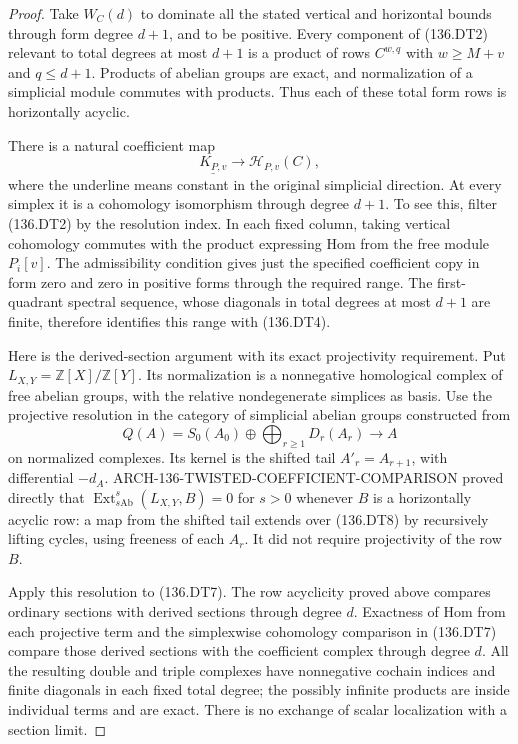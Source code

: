 \begin{proof}
Take \(W_C(d)\) to dominate all the stated vertical and horizontal
bounds through form degree \(d+1\), and to be positive.
Every component of (136.DT2) relevant to total degrees at most
\(d+1\) is a product of rows \(C^{w,q}\) with
\(w\geq M+v\) and \(q\leq d+1\).
Products of abelian groups are exact, and normalization of a
simplicial module commutes with products. Thus each of these
total form rows is horizontally acyclic.

There is a natural coefficient map
\[
             \underline{K_{P,v}}\longrightarrow
                              \mathcal H_{P,v}(C),      \tag{136.DT7}
\]
where the underline means constant in the original simplicial
direction. At every simplex it is a cohomology isomorphism
through degree \(d+1\). To see this, filter (136.DT2) by the
resolution index. In each fixed column, taking vertical cohomology
commutes with the product expressing Hom from the free module
\(P_i[v]\). The admissibility condition gives just the specified
coefficient copy in form zero and zero in positive forms through
the required range. The first-quadrant spectral sequence, whose
diagonals in total degrees at most \(d+1\) are finite, therefore
identifies this range with (136.DT4).

Here is the derived-section argument with its exact projectivity
requirement. Put \(L_{X,Y}=\mathbb Z[X]/\mathbb Z[Y]\).
Its normalization is a nonnegative homological complex of free
abelian groups, with the relative nondegenerate simplices as basis.
Use the projective resolution in the category of simplicial
abelian groups constructed from
\[
 Q(A)=S_0(A_0)\oplus\bigoplus_{r\geq1}D_r(A_r)
                       \longrightarrow A
                                                        \tag{136.DT8}
\]
on normalized complexes. Its kernel is the shifted tail
\(A'_r=A_{r+1}\), with differential \(-d_A\).
ARCH-136-TWISTED-COEFFICIENT-COMPARISON proved directly that
\(\operatorname{Ext}^{s}_{s\mathrm{Ab}}(L_{X,Y},B)=0\)
for \(s>0\) whenever \(B\) is a horizontally acyclic row:
a map from the shifted tail extends over (136.DT8) by recursively
lifting cycles, using freeness of each \(A_r\).
It did not require projectivity of the row \(B\).

Apply this resolution to (136.DT7). The row acyclicity proved
above compares ordinary sections with derived sections through
degree \(d\). Exactness of Hom from each projective term and
the simplexwise cohomology comparison in (136.DT7) compare those
derived sections with the coefficient complex through degree
\(d\). All the resulting double and triple complexes have
nonnegative cochain indices and finite diagonals in each fixed
total degree; the possibly infinite products are inside individual
terms and are exact. There is no exchange of scalar localization
with a section limit.


\end{proof}
